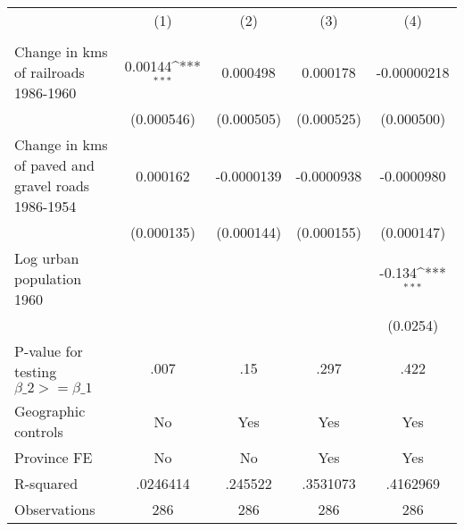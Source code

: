 {
\def\sym#1{\ifmmode^{#1}\else\(^{#1}\)\fi}
\begin{tabular}{l*{4}{c}}
\hline\hline
                &\multicolumn{1}{c}{(1)}&\multicolumn{1}{c}{(2)}&\multicolumn{1}{c}{(3)}&\multicolumn{1}{c}{(4)}\\
                &\multicolumn{1}{c}{}&\multicolumn{1}{c}{}&\multicolumn{1}{c}{}&\multicolumn{1}{c}{}\\
\hline
Change in kms of railroads 1986-1960&  0.00144\sym{***}& 0.000498         & 0.000178         &-0.00000218         \\
                &(0.000546)         &(0.000505)         &(0.000525)         &(0.000500)         \\
[1em]
Change in kms of paved and gravel roads 1986-1954& 0.000162         &-0.0000139         &-0.0000938         &-0.0000980         \\
                &(0.000135)         &(0.000144)         &(0.000155)         &(0.000147)         \\
[1em]
Log urban population 1960&                  &                  &                  &   -0.134\sym{***}\\
                &                  &                  &                  & (0.0254)         \\
\hline
P-value for testing $\beta\_{2} >= \beta\_{1}$&     .007         &      .15         &     .297         &     .422         \\
Geographic controls&       No         &      Yes         &      Yes         &      Yes         \\
Province FE     &       No         &       No         &      Yes         &      Yes         \\
R-squared       & .0246414         &  .245522         & .3531073         & .4162969         \\
Observations    &      286         &      286         &      286         &      286         \\
\hline\hline
\end{tabular}
}
